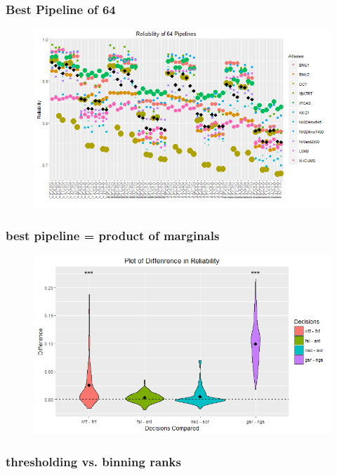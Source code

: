 \documentclass{article}
\begin{document}
\subsubsection{Best Pipeline of 64}

\begin{figure}[t!]
\includegraphics[width=\linewidth]{../Figs/64_pipelines_gg.png}
\caption{}
\label{fig:64}
\end{figure}


\subsubsection{best pipeline = product of marginals}


\begin{figure}[t!]
\includegraphics[width=\linewidth]{../Figs/Differ_violin_mean.png}
\caption{}
\label{fig:64}
\end{figure}



\subsubsection{thresholding vs. binning ranks}
\end{document}
